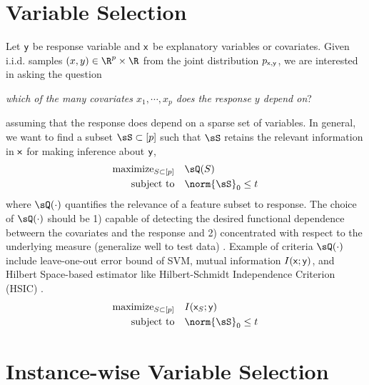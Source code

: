 \documentclass[11pt]{article}
\begin{document}
\section{Variable Selection}
 
Let $\mathsf{y}$ be response variable and $\mathsf{x}$ be explanatory variables or covariates. Given i.i.d. samples $(x,y)\in\R^p\times\R$ from the joint distribution $p_{\mathsf{x},\mathsf{y}}$, we are interested in asking the question 
\begin{center}
    \textit{which of the many covariates $x_1,\cdots,x_p$ does the response $y$ depend on}?
\end{center}
assuming that the response does depend on a sparse set of variables. In general, we want to find a subset $\sS\subset[p]$ such that $\sS$ retains the relevant information in $\mathsf{x}$ for making inference about $\mathsf{y}$,
\begin{align}
    \text{maximize}_{S\subset[p]} 
        \quad& \sQ(S) \nonumber \\
    \text{subject to}
        \quad& \norm{\sS}_0 \leq t \nonumber
\end{align}
where $\sQ(\cdot)$ quantifies the relevance of a feature subset to response. The choice of $\sQ(\cdot)$ should be 1) capable of detecting the desired functional dependence betweern the covariates and the response and 2) concentrated with respect to the underlying measure (generalize well to test data) \cite{songFeatureSelectionDependence2012}. Example of criteria $\sQ(\cdot)$ include leave-one-out error bound of SVM, mutual information $I(\mathsf{x};\mathsf{y})$, and Hilbert Space-based estimator like Hilbert-Schmidt Independence Criterion (HSIC) \cite{grettonMeasuringStatisticalDependence2005}.
\begin{align}
    \text{maximize}_{S\subset[p]} 
        \quad& I(\rx_S;\ry) \nonumber \\
    \text{subject to}
        \quad& \norm{\sS}_0 \leq t \nonumber
\end{align}

\section{Instance-wise Variable Selection}
\end{document}
